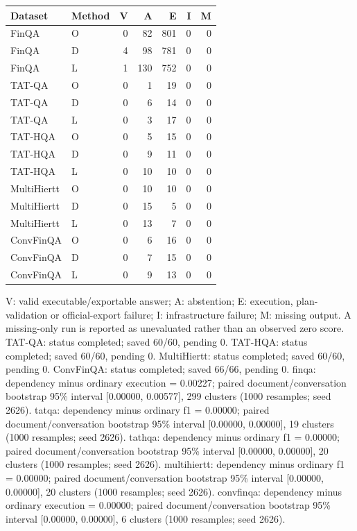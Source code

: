 \begin{center}\small\setlength{\tabcolsep}{2pt}\begin{tabular}{llrrrrr}
Dataset & Method & V & A & E & I & M\\\hline
FinQA & O & 0 & 82 & 801 & 0 & 0\\
FinQA & D & 4 & 98 & 781 & 0 & 0\\
FinQA & L & 1 & 130 & 752 & 0 & 0\\
TAT-QA & O & 0 & 1 & 19 & 0 & 0\\
TAT-QA & D & 0 & 6 & 14 & 0 & 0\\
TAT-QA & L & 0 & 3 & 17 & 0 & 0\\
TAT-HQA & O & 0 & 5 & 15 & 0 & 0\\
TAT-HQA & D & 0 & 9 & 11 & 0 & 0\\
TAT-HQA & L & 0 & 10 & 10 & 0 & 0\\
MultiHiertt & O & 0 & 10 & 10 & 0 & 0\\
MultiHiertt & D & 0 & 15 & 5 & 0 & 0\\
MultiHiertt & L & 0 & 13 & 7 & 0 & 0\\
ConvFinQA & O & 0 & 6 & 16 & 0 & 0\\
ConvFinQA & D & 0 & 7 & 15 & 0 & 0\\
ConvFinQA & L & 0 & 9 & 13 & 0 & 0\\
\end{tabular}\end{center}
V: valid executable/exportable answer; A: abstention; E: execution, plan-validation or official-export failure; I: infrastructure failure; M: missing output. A missing-only run is reported as unevaluated rather than an observed zero score.
TAT-QA: status completed; saved 60/60, pending 0.
TAT-HQA: status completed; saved 60/60, pending 0.
MultiHiertt: status completed; saved 60/60, pending 0.
ConvFinQA: status completed; saved 66/66, pending 0.
finqa: dependency minus ordinary execution = 0.00227; paired document/conversation bootstrap 95\% interval [0.00000, 0.00577], 299 clusters (1000 resamples; seed 2626).
tatqa: dependency minus ordinary f1 = 0.00000; paired document/conversation bootstrap 95\% interval [0.00000, 0.00000], 19 clusters (1000 resamples; seed 2626).
tathqa: dependency minus ordinary f1 = 0.00000; paired document/conversation bootstrap 95\% interval [0.00000, 0.00000], 20 clusters (1000 resamples; seed 2626).
multihiertt: dependency minus ordinary f1 = 0.00000; paired document/conversation bootstrap 95\% interval [0.00000, 0.00000], 20 clusters (1000 resamples; seed 2626).
convfinqa: dependency minus ordinary execution = 0.00000; paired document/conversation bootstrap 95\% interval [0.00000, 0.00000], 6 clusters (1000 resamples; seed 2626).
